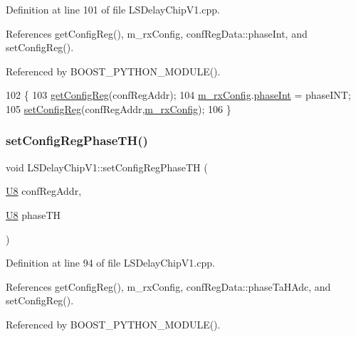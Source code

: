 Definition at line 101 of file L\+S\+Delay\+Chip\+V1.\+cpp.



References get\+Config\+Reg(), m\+\_\+rx\+Config, conf\+Reg\+Data\+::phase\+Int, and set\+Config\+Reg().



Referenced by B\+O\+O\+S\+T\+\_\+\+P\+Y\+T\+H\+O\+N\+\_\+\+M\+O\+D\+U\+L\+E().


\begin{DoxyCode}
102 \{
103     \hyperlink{classLSDelayChipV1_a4f338071d49df7eae55020a5f5fa8474}{getConfigReg}(confRegAddr);
104     \hyperlink{classLSDelayChipV1_a4818ac5c0d7ccf2845a01226234bdb67}{m\_rxConfig}.\hyperlink{structconfRegData_aee4fd08aceaaf19fcb8edfe8aa50f5ab}{phaseInt} = phaseINT;
105     \hyperlink{classLSDelayChipV1_a11fa2ebfa37c5cf0544ddb68c7d43e94}{setConfigReg}(confRegAddr,\hyperlink{classLSDelayChipV1_a4818ac5c0d7ccf2845a01226234bdb67}{m\_rxConfig});
106 \}
\end{DoxyCode}
\mbox{\label{classLSDelayChipV1_aa1364ef56bf75884756a8d589cee4328}} 
\subsubsection{\texorpdfstring{set\+Config\+Reg\+Phase\+T\+H()}{setConfigRegPhaseTH()}}
{\footnotesize\ttfamily void L\+S\+Delay\+Chip\+V1\+::set\+Config\+Reg\+Phase\+TH (\begin{DoxyParamCaption}\item[{\hyperlink{ICECALv3_8h_a3cb25ca6f51f003950f9625ff05536fc}{U8}}]{conf\+Reg\+Addr,  }\item[{\hyperlink{ICECALv3_8h_a3cb25ca6f51f003950f9625ff05536fc}{U8}}]{phase\+TH }\end{DoxyParamCaption})}



Definition at line 94 of file L\+S\+Delay\+Chip\+V1.\+cpp.



References get\+Config\+Reg(), m\+\_\+rx\+Config, conf\+Reg\+Data\+::phase\+Ta\+H\+Adc, and set\+Config\+Reg().



Referenced by B\+O\+O\+S\+T\+\_\+\+P\+Y\+T\+H\+O\+N\+\_\+\+M\+O\+D\+U\+L\+E().


